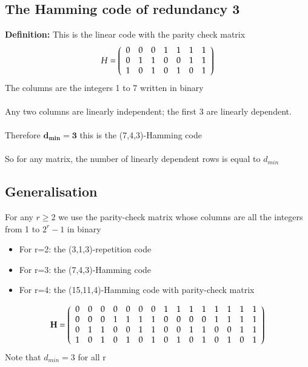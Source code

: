 \documentclass{article}[18pt]
\begin{document}
\subsection{The Hamming code of redundancy 3}
\textbf{Definition:} This is the linear code with the parity check matrix
$$H = \left( \begin{array} { l l l l l l l } { 0 } & { 0 } & { 0 } & { 1 } & { 1 } & { 1 } & { 1 } \\ { 0 } & { 1 } & { 1 } & { 0 } & { 0 } & { 1 } & { 1 } \\ { 1 } & { 0 } & { 1 } & { 0 } & { 1 } & { 0 } & { 1 } \end{array} \right)$$
The columns are the integers 1 to 7 written in binary\\
\\
Any two columns are linearly independent; the first 3 are linearly dependent.\\
\\
Therefore $\mathbf{d_{min}=3}$ this is the (7,4,3)-Hamming code\\
\\
So for any matrix, the number of linearly dependent rows is equal to $d_{min}$
\subsection{Generalisation}
For any $r\geqslant 2$ we use the parity-check matrix whose columns are all the integers from 1 to $2^r-1$ in binary
\begin{itemize}
	\item For r=2: the (3,1,3)-repetition code
	\item For r=3: the (7,4,3)-Hamming code
	\item For r=4: the (15,11,4)-Hamming code with parity-check matrix
\end{itemize}
$$\mathbf { H } = \left( \begin{array} { l l l l l l l l l l l l l l l } { 0 } & { 0 } & { 0 } & { 0 } & { 0 } & { 0 } & { 0 } & { 1 } & { 1 } & { 1 } & { 1 } & { 1 } & { 1 } & { 1 } & { 1 } \\ { 0 } & { 0 } & { 0 } & { 1 } & { 1 } & { 1 } & { 1 } & { 0 } & { 0 } & { 0 } & { 0 } & { 1 } & { 1 } & { 1 } & { 1 } \\ { 0 } & { 1 } & { 1 } & { 0 } & { 0 } & { 1 } & { 1 } & { 0 } & { 0 } & { 1 } & { 1 } & { 0 } & { 0 } & { 1 } & { 1 } \\ { 1 } & { 0 } & { 1 } & { 0 } & { 1 } & { 0 } & { 1 } & { 0 } & { 1 } & { 0 } & { 1 } & { 0 } & { 1 } & { 0 } & { 1 } \end{array} \right)$$
Note that $d_{min}=3$ for all r
\end{document}
